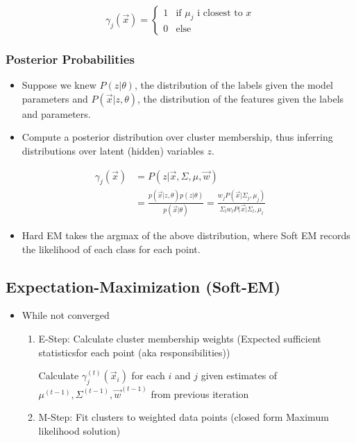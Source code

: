\documentclass[8pt,a4paper]{scrartcl}
\begin{document}
\begin{multicols*}{3}
\[\gamma_j(\vec{x})=\begin{cases}1&\text{if $\mu_j$ i closest to $x$}\\0&\text{else}\end{cases}\]

\subsubsection{Posterior Probabilities}

\begin{itemize}
\ncompaq
\item Suppose we knew $P(z|\theta)$, the distribution of the labels given the model parameters and $P(\vec{x}|z,\theta)$, the distribution of the features given the labels and parameters.
\item Compute a posterior distribution over cluster membership, thus inferring distributions over latent (hidden) variables $z$.
\end{itemize}

\begin{align*}
\gamma_j(\vec{x})&=P(z|\vec{x},\Sigma,\mu,\vec{w})\\
&=\frac{p(\vec{x}|z,\theta)p(z|\theta)}{p(\vec{x}|\theta)}=\frac{w_jP(\vec{x}|\Sigma_j,\mu_j)}{\Sigma_lw_lP(\vec{x}|\Sigma_l,\mu_l}
\end{align*}

\begin{itemize}
\ncompaq
\item Hard EM takes the argmax of the above distribution, where Soft EM records the likelihood of each class for each point.
\end{itemize}

\subsection{Expectation-Maximization (Soft-EM)}

\begin{itemize}
\ncompaq
\item While not converged
\begin{enumerate}
\ncompaq
\item E-Step: Calculate cluster membership weights (\glqq Expected sufficient statistics\grqq  for each point (aka \glqq responsibilities\grqq))

Calculate $\gamma_j^{(t)}(\vec{x}_i)$ for each $i$ and $j$ given estimates of $\mu^{(t-1)},\Sigma^{(t-1)},\vec{w}^{(t-1)}$ from previous iteration
\item M-Step: Fit clusters to weighted data points (closed form Maximum likelihood solution)


\end{enumerate}
\end{itemize}
\end{multicols*}
\end{document}
